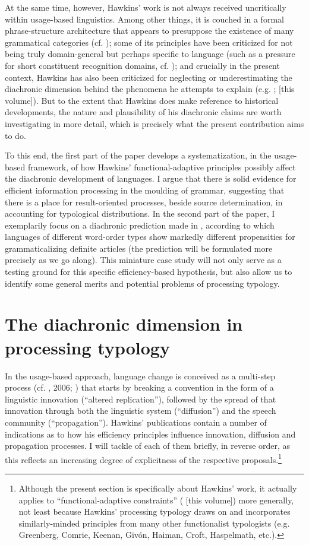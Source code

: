 \documentclass[output=paper]{langsci/langscibook}
\begin{document}
At the same time, however, Hawkins’ work is not always received uncritically within usage-based linguistics. Among other things, it is couched in a formal phrase-structure architecture that appears to presuppose the existence of many grammatical categories (cf. \citealt{Diessel2016}); some of its principles have been criticized for not being truly domain-general but perhaps specific to language (such as a pressure for short constituent recognition domains, cf. \citealt{Bybee2010}); and crucially in the present context, Hawkins has also been criticized for neglecting or underestimating the diachronic dimension behind the phenomena he attempts to explain (e.g. \citealt{Cristofaro2017}; \citealt{Collins2018} [this volume]). But to the extent that Hawkins does make reference to historical developments, the nature and plausibility of his diachronic claims are worth investigating in more detail, which is precisely what the present contribution aims to do. 

To this end, the first part of the paper develops a systematization, in the usage-based framework, of how Hawkins’ functional-adaptive principles possibly affect the diachronic development of languages. I argue that there is solid evidence for efficient information processing in the moulding of grammar, suggesting that there is a place for result-oriented processes, beside source determination, in accounting for typological distributions. In the second part of the paper, I exemplarily focus on a diachronic prediction made in \citet{Hawkins2014}, according to which languages of different word-order types show markedly different propensities for grammaticalizing definite articles (the prediction will be formulated more precisely as we go along). This miniature case study will not only serve as a testing ground for this specific efficiency-based hypothesis, but also allow us to identify some general merits and potential problems of processing typology.

\section{ The diachronic dimension in processing typology} 

In the usage-based approach, language change is conceived as a multi-step process (cf. \citealt{Croft2000}, 2006; \citealt{Aitchison2013}) that starts by breaking a convention in the form of a linguistic innovation (“altered replication”), followed by the spread of that innovation through both the linguistic system (“diffusion”) and the speech community (“propagation”). Hawkins’ publications contain a number of indications as to how his efficiency principles influence innovation, diffusion and propagation processes. I will tackle of each of them briefly, in reverse order, as this reflects an increasing degree of explicitness of the respective proposals.\footnote{Although the present section is specifically about Hawkins’ work, it actually applies to “functional-adaptive constraints” (\citealt{Haspelmath2018} [this volume]) more generally, not least because Hawkins’ processing typology draws on and incorporates similarly-minded principles from many other functionalist typologists (e.g. Greenberg, Comrie, Keenan, Givón, Haiman, Croft, Haspelmath, etc.).}
\end{document}
